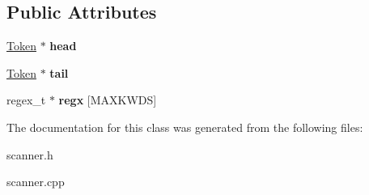 \subsection*{Public Attributes}
\begin{DoxyCompactItemize}
\item 
\hypertarget{classScanner_a238d14dc6c85e8418e2a21a72f3d2a9a}{\hyperlink{classToken}{Token} $\ast$ {\bfseries head}}\label{classScanner_a238d14dc6c85e8418e2a21a72f3d2a9a}

\item 
\hypertarget{classScanner_aa1250cba137879ad6831185650d0641a}{\hyperlink{classToken}{Token} $\ast$ {\bfseries tail}}\label{classScanner_aa1250cba137879ad6831185650d0641a}

\item 
\hypertarget{classScanner_a9c0882c3e4c4e83da0e66bf97aebed19}{regex\-\_\-t $\ast$ {\bfseries regx} \mbox{[}M\-A\-X\-K\-W\-D\-S\mbox{]}}\label{classScanner_a9c0882c3e4c4e83da0e66bf97aebed19}

\end{DoxyCompactItemize}


The documentation for this class was generated from the following files\-:\begin{DoxyCompactItemize}
\item 
scanner.\-h\item 
scanner.\-cpp\end{DoxyCompactItemize}
